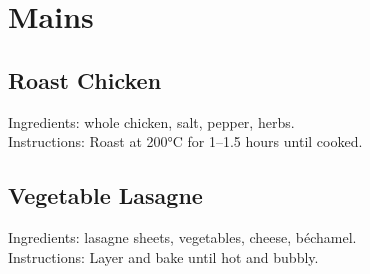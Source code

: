 \chapter{Mains}

\section*{Roast Chicken}
Ingredients: whole chicken, salt, pepper, herbs. \\
Instructions: Roast at 200°C for 1–1.5 hours until cooked.

\section*{Vegetable Lasagne}
Ingredients: lasagne sheets, vegetables, cheese, béchamel. \\
Instructions: Layer and bake until hot and bubbly.